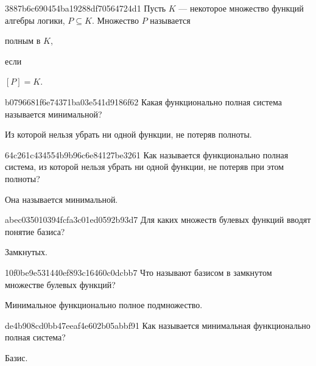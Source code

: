 \begin{note}{3887b6c690454ba19288df70564724d1}
    Пусть \({ K }\) --- некоторое множество функций алгебры логики, \({ P \subseteq K }\).
    Множество \({ P }\) называется \begin{icloze}{2}полным в \({ K }\),\end{icloze} если \begin{icloze}{1}\({ \left[ P \right] = K }\).\end{icloze}
\end{note}

\begin{note}{b0796681f6e74371ba03e541d9186f62}
    Какая функционально полная система называется минимальной?

    \begin{cloze}{1}
        Из которой нельзя убрать ни одной функции, не потеряв полноты.
    \end{cloze}
\end{note}

\begin{note}{64c261c434554b9b96c6e84127be3261}
    Как называется функционально полная система, из которой нельзя убрать ни одной функции, не потеряв при этом полноты?

    \begin{cloze}{1}
        Она называется минимальной.
    \end{cloze}
\end{note}

\begin{note}{abec035010394fcfa3c01ed0592b93d7}
    Для каких множеств булевых функций вводят понятие базиса?

    \begin{cloze}{1}
        Замкнутых.
    \end{cloze}
\end{note}

\begin{note}{10f0be9e531440ef893c16460c0dcbb7}
    Что называют базисом в замкнутом множестве булевых функций?

    \begin{cloze}{1}
        Минимальное функционально полное подмножество.
    \end{cloze}
\end{note}

\begin{note}{de4b908cd0bb47eeaf4e602b05abbf91}
    Как называется минимальная функционально полная система?

    \begin{cloze}{1}
        Базис.
    \end{cloze}
\end{note}


